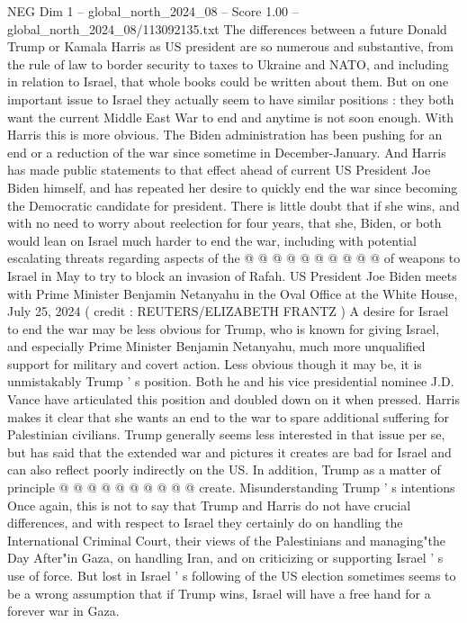 \begin{textsample}{NEG Dim 1 – global\_north\_2024\_08 – Score 1.00 – global\_north\_2024\_08/113092135.txt}  \label{ex:f1_neg_048}
The differences between a future Donald Trump or Kamala Harris as US president are so numerous and substantive, from the rule of law to border security to taxes to Ukraine and NATO, and including in relation to Israel, that whole books could be written about them.
But on one important issue to Israel they actually seem to have similar positions : they both want the current Middle East War to end and anytime is not soon enough.
With Harris this is more obvious.
The Biden administration has been pushing for an end or a reduction of the war since sometime in December-January.
And Harris has made public statements to that effect ahead of current US President Joe Biden himself, and has repeated her desire to quickly end the war since becoming the Democratic candidate for president.
There is little doubt that if she wins, and with no need to worry about reelection for four years, that she, Biden, or both would lean on Israel much harder to end the war, including with potential escalating threats regarding aspects of the @ @ @ @ @ @ @ @ @ @ of weapons to Israel in May to try to block an invasion of Rafah.
US President Joe Biden meets with Prime Minister Benjamin Netanyahu in the Oval Office at the White House, July 25, 2024 ( credit : REUTERS/ELIZABETH FRANTZ ) A desire for Israel to end the war may be less obvious for Trump, who is known for giving Israel, and especially Prime Minister Benjamin Netanyahu, much more unqualified support for military and covert action.
Less obvious though it may be, it is unmistakably Trump ' s position.
Both he and his vice presidential nominee J.D.
Vance have articulated this position and doubled down on it when pressed.
Harris makes it clear that she wants an end to the war to spare additional suffering for Palestinian civilians.
Trump generally seems less interested in that issue per se, but has said that the extended war and pictures it creates are bad for Israel and can also reflect poorly indirectly on the US.
In addition, Trump as a matter of principle @ @ @ @ @ @ @ @ @ @ create.
Misunderstanding Trump ' s intentions Once again, this is not to say that Trump and Harris do not have crucial differences, and with respect to Israel they certainly do on handling the International Criminal Court, their views of the Palestinians and managing"the Day After"in Gaza, on handling Iran, and on criticizing or supporting Israel ' s use of force.
But lost in Israel ' s following of the US election sometimes seems to be a wrong assumption that if Trump wins, Israel will have a free hand for a forever war in Gaza.

\end{textsample}

